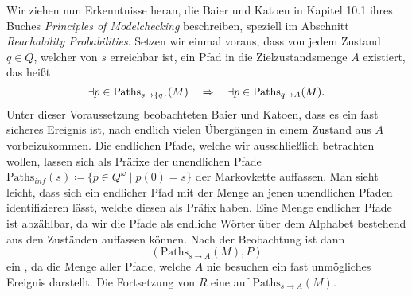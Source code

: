 \documentclass[a4paper]{article}
\theoremstyle{nonumberplain}
\begin{document}
Wir ziehen nun Erkenntnisse heran, die Baier und Katoen in Kapitel 10.1 ihres Buches \textit{Principles of Modelchecking} \cite{Bai08} beschreiben, speziell im Abschnitt \textit{Reachability Probabilities}.
Setzen wir einmal voraus, dass von jedem Zustand $q\in Q$, welcher von $s$ erreichbar ist, ein Pfad in die Zielzustandsmenge $A$ existiert, das heißt
\[
\exists p \in \mathrm{Paths}_{s \rightarrow \{q\}}(M)  \quad \Rightarrow \quad \exists p \in \mathrm{Paths}_{q \rightarrow A}(M) \text{.}
\]
 Unter dieser Voraussetzung beobachteten Baier und Katoen, dass es ein fast sicheres Ereignis ist, nach endlich vielen Übergängen in einem Zustand aus $A$ vorbeizukommen.
Die endlichen Pfade, welche wir ausschließlich betrachten wollen, lassen sich als Präfixe der unendlichen Pfade $\mathrm{Paths}_{inf}(s) \coloneqq \{p \in Q^\omega \mid p(0) = s\}$ der Markovkette auffassen.
Man sieht leicht, dass sich ein endlicher Pfad mit der Menge an jenen unendlichen Pfaden identifizieren lässt, welche diesen als  Präfix haben.
Eine Menge endlicher Pfade ist abzählbar, da wir die Pfade als endliche Wörter über dem Alphabet bestehend aus den Zuständen auffassen können.
Nach der Beobachtung ist dann
\[
(\mathrm{Paths}_{s \rightarrow A}(M), P)
\] ein \probspace{}, da die Menge aller Pfade, welche $A$ nie besuchen ein fast unmögliches Ereignis darstellt. Die Fortsetzung von $R$ eine \rvar{} auf $\mathrm{Paths}_{s \rightarrow A}(M)$. 
\end{document}
